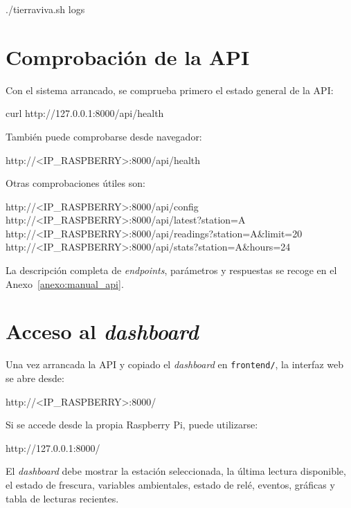 \begin{bashcode}
./tierraviva.sh logs
\end{bashcode}

\section{Comprobación de la API}

Con el sistema arrancado, se comprueba primero el estado general de la API:

\begin{bashcode}
curl http://127.0.0.1:8000/api/health
\end{bashcode}

También puede comprobarse desde navegador:

\begin{terminaloutput}
http://<IP_RASPBERRY>:8000/api/health
\end{terminaloutput}

Otras comprobaciones útiles son:

\begin{terminaloutput}
http://<IP_RASPBERRY>:8000/api/config
http://<IP_RASPBERRY>:8000/api/latest?station=A
http://<IP_RASPBERRY>:8000/api/readings?station=A&limit=20
http://<IP_RASPBERRY>:8000/api/stats?station=A&hours=24
\end{terminaloutput}

La descripción completa de \textit{endpoints}, parámetros y respuestas se recoge en el Anexo~\ref{anexo:manual_api}.

\section{Acceso al \textit{dashboard}}

Una vez arrancada la API y copiado el \textit{dashboard} en \texttt{frontend/}, la interfaz web se abre desde:

\begin{terminaloutput}
http://<IP_RASPBERRY>:8000/
\end{terminaloutput}

Si se accede desde la propia Raspberry Pi, puede utilizarse:

\begin{terminaloutput}
http://127.0.0.1:8000/
\end{terminaloutput}

El \textit{dashboard} debe mostrar la estación seleccionada, la última lectura disponible, el estado de frescura, variables ambientales, estado de relé, eventos, gráficas y tabla de lecturas recientes.

